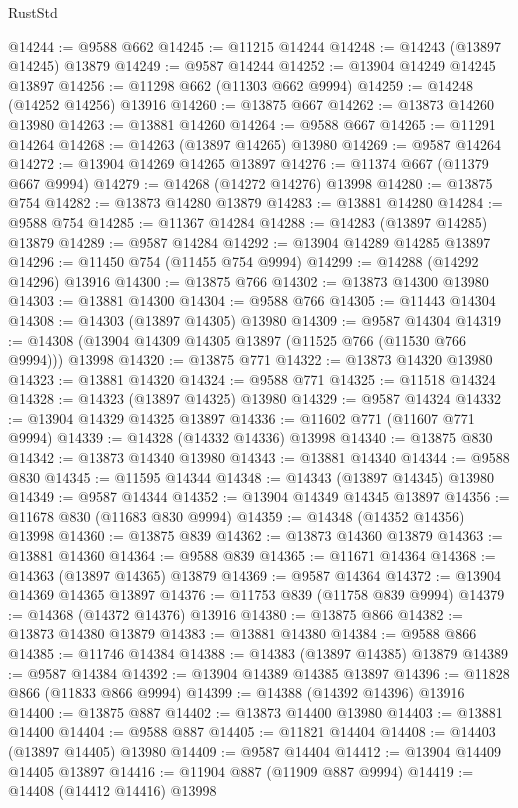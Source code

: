 \begin{lexlean}{RustStd}
\begin{coremodule}
@14244 := @9588 @662
@14245 := @11215 @14244
@14248 := @14243 (@13897 @14245) @13879
@14249 := @9587 @14244
@14252 := @13904 @14249 @14245 @13897
@14256 := @11298 @662 (@11303 @662 @9994)
@14259 := @14248 (@14252 @14256) @13916
@14260 := @13875 @667
@14262 := @13873 @14260 @13980
@14263 := @13881 @14260
@14264 := @9588 @667
@14265 := @11291 @14264
@14268 := @14263 (@13897 @14265) @13980
@14269 := @9587 @14264
@14272 := @13904 @14269 @14265 @13897
@14276 := @11374 @667 (@11379 @667 @9994)
@14279 := @14268 (@14272 @14276) @13998
@14280 := @13875 @754
@14282 := @13873 @14280 @13879
@14283 := @13881 @14280
@14284 := @9588 @754
@14285 := @11367 @14284
@14288 := @14283 (@13897 @14285) @13879
@14289 := @9587 @14284
@14292 := @13904 @14289 @14285 @13897
@14296 := @11450 @754 (@11455 @754 @9994)
@14299 := @14288 (@14292 @14296) @13916
@14300 := @13875 @766
@14302 := @13873 @14300 @13980
@14303 := @13881 @14300
@14304 := @9588 @766
@14305 := @11443 @14304
@14308 := @14303 (@13897 @14305) @13980
@14309 := @9587 @14304
@14319 := @14308 (@13904 @14309 @14305 @13897 (@11525 @766 (@11530 @766 @9994))) @13998
@14320 := @13875 @771
@14322 := @13873 @14320 @13980
@14323 := @13881 @14320
@14324 := @9588 @771
@14325 := @11518 @14324
@14328 := @14323 (@13897 @14325) @13980
@14329 := @9587 @14324
@14332 := @13904 @14329 @14325 @13897
@14336 := @11602 @771 (@11607 @771 @9994)
@14339 := @14328 (@14332 @14336) @13998
@14340 := @13875 @830
@14342 := @13873 @14340 @13980
@14343 := @13881 @14340
@14344 := @9588 @830
@14345 := @11595 @14344
@14348 := @14343 (@13897 @14345) @13980
@14349 := @9587 @14344
@14352 := @13904 @14349 @14345 @13897
@14356 := @11678 @830 (@11683 @830 @9994)
@14359 := @14348 (@14352 @14356) @13998
@14360 := @13875 @839
@14362 := @13873 @14360 @13879
@14363 := @13881 @14360
@14364 := @9588 @839
@14365 := @11671 @14364
@14368 := @14363 (@13897 @14365) @13879
@14369 := @9587 @14364
@14372 := @13904 @14369 @14365 @13897
@14376 := @11753 @839 (@11758 @839 @9994)
@14379 := @14368 (@14372 @14376) @13916
@14380 := @13875 @866
@14382 := @13873 @14380 @13879
@14383 := @13881 @14380
@14384 := @9588 @866
@14385 := @11746 @14384
@14388 := @14383 (@13897 @14385) @13879
@14389 := @9587 @14384
@14392 := @13904 @14389 @14385 @13897
@14396 := @11828 @866 (@11833 @866 @9994)
@14399 := @14388 (@14392 @14396) @13916
@14400 := @13875 @887
@14402 := @13873 @14400 @13980
@14403 := @13881 @14400
@14404 := @9588 @887
@14405 := @11821 @14404
@14408 := @14403 (@13897 @14405) @13980
@14409 := @9587 @14404
@14412 := @13904 @14409 @14405 @13897
@14416 := @11904 @887 (@11909 @887 @9994)
@14419 := @14408 (@14412 @14416) @13998

\end{coremodule}
\end{lexlean}
